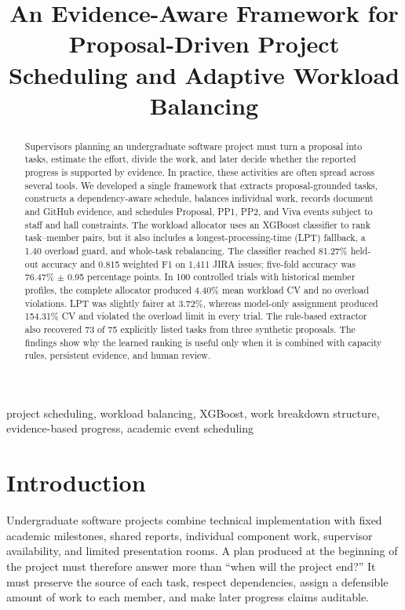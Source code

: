 \documentclass[conference]{IEEEtran}
\title{An Evidence-Aware Framework for Proposal-Driven Project Scheduling and Adaptive Workload Balancing}
\author{}
\begin{document}
\maketitle

\begin{abstract}
Supervisors planning an undergraduate software project must turn a proposal into tasks, estimate the effort, divide the work, and later decide whether the reported progress is supported by evidence. In practice, these activities are often spread across several tools. We developed a single framework that extracts proposal-grounded tasks, constructs a dependency-aware schedule, balances individual work, records document and GitHub evidence, and schedules Proposal, PP1, PP2, and Viva events subject to staff and hall constraints. The workload allocator uses an XGBoost classifier to rank task--member pairs, but it also includes a longest-processing-time (LPT) fallback, a 1.40 overload guard, and whole-task rebalancing. The classifier reached 81.27\% held-out accuracy and 0.815 weighted F1 on 1,411 JIRA issues; five-fold accuracy was 76.47\% $\pm$ 0.95 percentage points. In 100 controlled trials with historical member profiles, the complete allocator produced 4.40\% mean workload CV and no overload violations. LPT was slightly fairer at 3.72\%, whereas model-only assignment produced 154.31\% CV and violated the overload limit in every trial. The rule-based extractor also recovered 73 of 75 explicitly listed tasks from three synthetic proposals. The findings show why the learned ranking is useful only when it is combined with capacity rules, persistent evidence, and human review.
\end{abstract}

\begin{IEEEkeywords}
project scheduling, workload balancing, XGBoost, work breakdown structure, evidence-based progress, academic event scheduling
\end{IEEEkeywords}

\section{Introduction}
Undergraduate software projects combine technical implementation with fixed academic milestones, shared reports, individual component work, supervisor availability, and limited presentation rooms. A plan produced at the beginning of the project must therefore answer more than ``when will the project end?'' It must preserve the source of each task, respect dependencies, assign a defensible amount of work to each member, and make later progress claims auditable.
\end{document}
